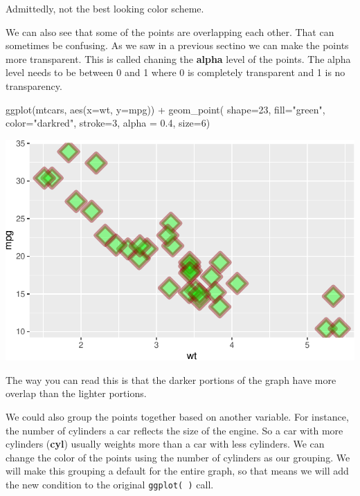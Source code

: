 \documentclass[
  letterpaper,
  DIV=11,
  numbers=noendperiod]{scrreprt}
\newenvironment{Shaded}{\begin{snugshade}}{\end{snugshade}}
\newcommand{\AttributeTok}[1]{\textcolor[rgb]{0.40,0.45,0.13}{#1}}
\newcommand{\DecValTok}[1]{\textcolor[rgb]{0.68,0.00,0.00}{#1}}
\newcommand{\FloatTok}[1]{\textcolor[rgb]{0.68,0.00,0.00}{#1}}
\newcommand{\FunctionTok}[1]{\textcolor[rgb]{0.28,0.35,0.67}{#1}}
\newcommand{\NormalTok}[1]{\textcolor[rgb]{0.00,0.23,0.31}{#1}}
\newcommand{\SpecialCharTok}[1]{\textcolor[rgb]{0.37,0.37,0.37}{#1}}
\newcommand{\StringTok}[1]{\textcolor[rgb]{0.13,0.47,0.30}{#1}}
\begin{document}
Admittedly, not the best looking color scheme.

We can also see that some of the points are overlapping each other. That
can sometimes be confusing. As we saw in a previous sectino we can make
the points more transparent. This is called chaning the \textbf{alpha}
level of the points. The alpha level needs to be between 0 and 1 where 0
is completely transparent and 1 is no transparency.

\begin{Shaded}
\begin{Highlighting}[]
\FunctionTok{ggplot}\NormalTok{(mtcars, }\FunctionTok{aes}\NormalTok{(}\AttributeTok{x=}\NormalTok{wt, }\AttributeTok{y=}\NormalTok{mpg)) }\SpecialCharTok{+}
  \FunctionTok{geom\_point}\NormalTok{( }\AttributeTok{shape=}\DecValTok{23}\NormalTok{, }\AttributeTok{fill=}\StringTok{"green"}\NormalTok{, }\AttributeTok{color=}\StringTok{"darkred"}\NormalTok{, }\AttributeTok{stroke=}\DecValTok{3}\NormalTok{, }
              \AttributeTok{alpha =} \FloatTok{0.4}\NormalTok{, }\AttributeTok{size=}\DecValTok{6}\NormalTok{)}
\end{Highlighting}
\end{Shaded}

\includegraphics{Advanced_Scatterplot_Techniques_files/figure-pdf/unnamed-chunk-8-1.pdf}

The way you can read this is that the darker portions of the graph have
more overlap than the lighter portions.

We could also group the points together based on another variable. For
instance, the number of cylinders a car reflects the size of the engine.
So a car with more cylinders (\textbf{cyl}) usually weights more than a
car with less cylinders. We can change the color of the points using the
number of cylinders as our grouping. We will make this grouping a
default for the entire graph, so that means we will add the new
condition to the original \texttt{ggplot(\ )} call.
\end{document}
